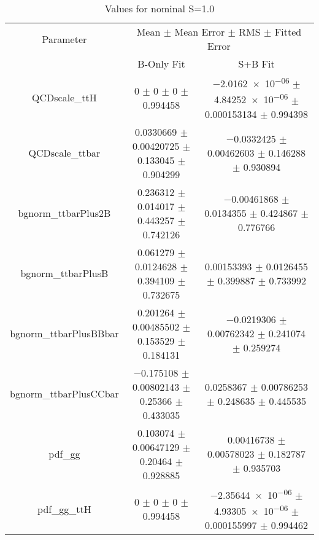 \begin{table}
\centering
\caption{Values for nominal S=1.0}
\begin{tabular}{ccc}
\toprule
Parameter & \multicolumn{2}{c}{Mean $\pm$ Mean Error $\pm$ RMS $\pm$ Fitted Error}\\
 & B-Only Fit & S+B Fit\\
\midrule
QCDscale\_ttH & \num{0} $\pm$ \num{0} $\pm$ \num{0} $\pm$ \num{0.994458} & \num{-2.0162e-06} $\pm$ \num{4.84252e-06} $\pm$ \num{0.000153134} $\pm$ \num{0.994398}\\
QCDscale\_ttbar & \num{0.0330669} $\pm$ \num{0.00420725} $\pm$ \num{0.133045} $\pm$ \num{0.904299} & \num{-0.0332425} $\pm$ \num{0.00462603} $\pm$ \num{0.146288} $\pm$ \num{0.930894}\\
bgnorm\_ttbarPlus2B & \num{0.236312} $\pm$ \num{0.014017} $\pm$ \num{0.443257} $\pm$ \num{0.742126} & \num{-0.00461868} $\pm$ \num{0.0134355} $\pm$ \num{0.424867} $\pm$ \num{0.776766}\\
bgnorm\_ttbarPlusB & \num{0.061279} $\pm$ \num{0.0124628} $\pm$ \num{0.394109} $\pm$ \num{0.732675} & \num{0.00153393} $\pm$ \num{0.0126455} $\pm$ \num{0.399887} $\pm$ \num{0.733992}\\
bgnorm\_ttbarPlusBBbar & \num{0.201264} $\pm$ \num{0.00485502} $\pm$ \num{0.153529} $\pm$ \num{0.184131} & \num{-0.0219306} $\pm$ \num{0.00762342} $\pm$ \num{0.241074} $\pm$ \num{0.259274}\\
bgnorm\_ttbarPlusCCbar & \num{-0.175108} $\pm$ \num{0.00802143} $\pm$ \num{0.25366} $\pm$ \num{0.433035} & \num{0.0258367} $\pm$ \num{0.00786253} $\pm$ \num{0.248635} $\pm$ \num{0.445535}\\
pdf\_gg & \num{0.103074} $\pm$ \num{0.00647129} $\pm$ \num{0.20464} $\pm$ \num{0.928885} & \num{0.00416738} $\pm$ \num{0.00578023} $\pm$ \num{0.182787} $\pm$ \num{0.935703}\\
pdf\_gg\_ttH & \num{0} $\pm$ \num{0} $\pm$ \num{0} $\pm$ \num{0.994458} & \num{-2.35644e-06} $\pm$ \num{4.93305e-06} $\pm$ \num{0.000155997} $\pm$ \num{0.994462}\\
\bottomrule
\end{tabular}
\end{table}
